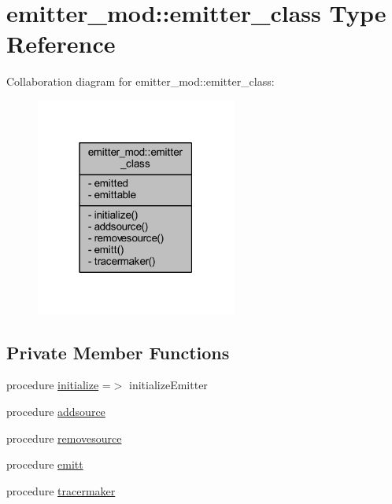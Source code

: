 \hypertarget{structemitter__mod_1_1emitter__class}{}\section{emitter\+\_\+mod\+:\+:emitter\+\_\+class Type Reference}
\label{structemitter__mod_1_1emitter__class}


Collaboration diagram for emitter\+\_\+mod\+:\+:emitter\+\_\+class\+:\nopagebreak
\begin{figure}[H]
\begin{center}
\leavevmode
\includegraphics[width=187pt]{structemitter__mod_1_1emitter__class__coll__graph}
\end{center}
\end{figure}
\subsection*{Private Member Functions}
\begin{DoxyCompactItemize}
\item 
procedure \mbox{\hyperlink{structemitter__mod_1_1emitter__class_acd215b2680677e298267c5940f0cf79b}{initialize}} =$>$ initialize\+Emitter
\item 
procedure \mbox{\hyperlink{structemitter__mod_1_1emitter__class_a162685b7b0bf96b555fee37e129c9783}{addsource}}
\item 
procedure \mbox{\hyperlink{structemitter__mod_1_1emitter__class_a277317a5cca4d7679d0e77edd350ef79}{removesource}}
\item 
procedure \mbox{\hyperlink{structemitter__mod_1_1emitter__class_ac33721448c01508a8e8c486cd7a76b65}{emitt}}
\item 
procedure \mbox{\hyperlink{structemitter__mod_1_1emitter__class_a35d90033d453c725390c4532cc8231f7}{tracermaker}}
\end{DoxyCompactItemize}
